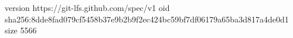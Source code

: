 version https://git-lfs.github.com/spec/v1
oid sha256:8dde8fad079cf5458b37e9b2b9f2ec424bc59bf7df06179a65ba3d817a4de0d1
size 5566
